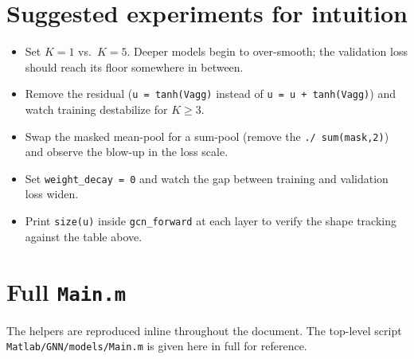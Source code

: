 \documentclass[11pt]{article}
\begin{document}
\section{Suggested experiments for intuition}

\begin{itemize}
  \item Set $K=1$ vs.\ $K=5$. Deeper models begin to over-smooth; the
        validation loss should reach its floor somewhere in between.
  \item Remove the residual
        (\texttt{u = tanh(Vagg)} instead of \texttt{u = u + tanh(Vagg)})
        and watch training destabilize for $K\geq 3$.
  \item Swap the masked mean-pool for a sum-pool
        (remove the \texttt{./ sum(mask,2)}) and observe the blow-up in
        the loss scale.
  \item Set \texttt{weight\_decay = 0} and watch the gap between training
        and validation loss widen.
  \item Print \texttt{size(u)} inside \texttt{gcn\_forward} at each layer
        to verify the shape tracking against the table above.
\end{itemize}

\appendix

\section{Full \texttt{Main.m}}

The helpers are reproduced inline throughout the document. The top-level
script \texttt{Matlab/GNN/models/Main.m} is given here in full for
reference.
\end{document}
